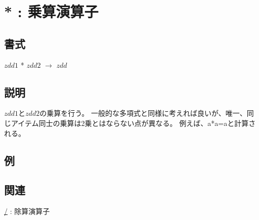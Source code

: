 
\section{* : 乗算演算子\label{sect:multiply}}
\subsection*{書式}
$zdd1$ * $zdd2$ $\rightarrow$ $zdd$

\subsection*{説明}
$zdd1$と$zdd2$の乗算を行う。
一般的な多項式と同様に考えれば良いが、唯一、同じアイテム同士の乗算は2乗とはならない点が異なる。
例えば、a*a=aと計算される。

\subsection*{例}


\subsection*{関連}
\hyperref[sect:quotiment]{/} : 除算演算子
